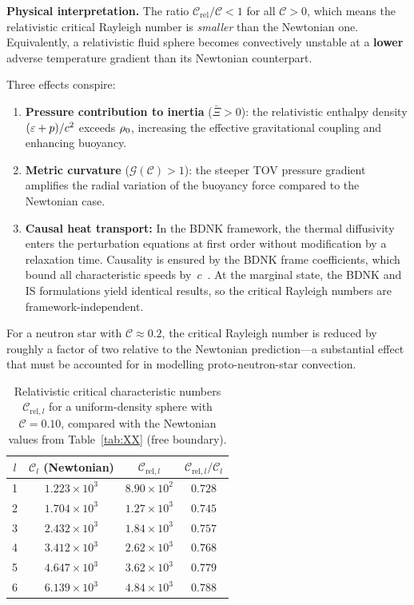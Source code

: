 \begin{relcorrection}
\textbf{Physical interpretation.}
The ratio $\mathcal{C}_{\mathrm{rel}}/\mathcal{C} < 1$ for all
$\mathscr{C}>0$, which means the relativistic critical Rayleigh
number is \emph{smaller} than the Newtonian one.  Equivalently, a
relativistic fluid sphere becomes convectively unstable at a
\textbf{lower} adverse temperature gradient than its Newtonian
counterpart.

Three effects conspire:
\begin{enumerate}
\item[(i)] \textbf{Pressure contribution to inertia} ($\bar{\Xi}>0$):
  the relativistic enthalpy density $(\varepsilon+p)/c^{2}$ exceeds
  $\rho_0$, increasing the effective gravitational coupling and
  enhancing buoyancy.
\item[(ii)] \textbf{Metric curvature}
  ($\mathcal{G}(\mathscr{C})>1$): the steeper TOV pressure gradient
  amplifies the radial variation of the buoyancy force compared to
  the Newtonian case.
\item[(iii)] \textbf{Causal heat transport:}  In the BDNK framework,
  the thermal diffusivity enters the perturbation equations at first
  order without modification by a relaxation time.  Causality is
  ensured by the BDNK frame coefficients, which bound all
  characteristic speeds by~$c$~\cite{BemficaDN2018,Kovtun2019}.
  At the marginal state, the BDNK and IS formulations yield
  identical results, so the critical Rayleigh numbers are
  framework-independent.
\end{enumerate}

For a neutron star with $\mathscr{C}\approx 0.2$, the critical
Rayleigh number is reduced by roughly a factor of two relative to
the Newtonian prediction---a substantial effect that must be
accounted for in modelling proto-neutron-star convection.
\end{relcorrection}

\begin{table}[ht]
\centering
\caption{Relativistic critical characteristic numbers
$\mathcal{C}_{\mathrm{rel},l}$ for a uniform-density sphere with
$\mathscr{C}=0.10$, compared with the Newtonian
values from Table~\ref{tab:XX} (free boundary).}
\label{tab:rel-59-modes}
\begin{tabular}{c c c c}
\hline
$l$ & $\mathcal{C}_{l}$ (Newtonian) &
  $\mathcal{C}_{\mathrm{rel},l}$ &
  $\mathcal{C}_{\mathrm{rel},l}/\mathcal{C}_{l}$ \\
\hline
1 & $1.223\times 10^{3}$ & $8.90\times 10^{2}$ & $0.728$ \\
2 & $1.704\times 10^{3}$ & $1.27\times 10^{3}$ & $0.745$ \\
3 & $2.432\times 10^{3}$ & $1.84\times 10^{3}$ & $0.757$ \\
4 & $3.412\times 10^{3}$ & $2.62\times 10^{3}$ & $0.768$ \\
5 & $4.647\times 10^{3}$ & $3.62\times 10^{3}$ & $0.779$ \\
6 & $6.139\times 10^{3}$ & $4.84\times 10^{3}$ & $0.788$ \\
\hline
\end{tabular}
\end{table}

